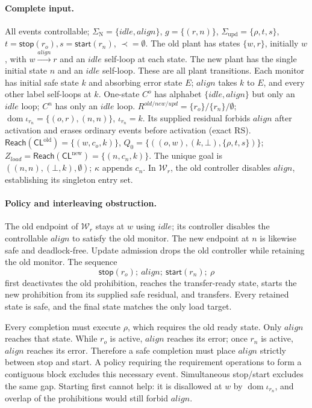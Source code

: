 \documentclass[11pt]{article}
\newcommand{\Reach}{\mathsf{Reach}}
\newcommand{\SigmaU}{\Sigma_{\mathrm{upd}}}
\newcommand{\ustart}[1]{\mathsf{start}(#1)}
\newcommand{\ustop}[1]{\mathsf{stop}(#1)}
\begin{document}
\paragraph{Complete input.}
All events controllable; $\Sigma_{\mathrm{N}}=\{idle,align\}$, $g=\{(r,n)\}$,
$\SigmaU=\{\rho,t,s\}$, $t=\ustop{r_o},s=\ustart{r_n}$, $\prec=\emptyset$.
The old plant has states $\{w,r\}$, initially $w$, with $w\xrightarrow{align}r$ and an $idle$ self-loop at each state. The new plant has the single initial state $n$ and an $idle$ self-loop. These are all plant transitions.
Each monitor has initial safe state $k$ and absorbing error state $E$; $align$ takes $k$ to $E$, and every other label self-loops at $k$.
One-state $C^o$ has alphabet $\{idle,align\}$ but only an $idle$ loop; $C^n$ has only an $idle$ loop.
$R^{old/new/upd}=\{r_o\}/\{r_n\}/\emptyset$;
$\operatorname{dom}\iota_{r_n}=\{(o,r),(n,n)\}$, $\iota_{r_n}=k$. Its supplied residual forbids $align$ after activation and erases ordinary events before activation (exact RS).
$\Reach(\mathsf{CL}^{\mathrm{old}})=\{(w,c_o,k)\}$,
$Q_0=\{((o,w),(k,\bot),\{\rho,t,s\})\}$;
$Z_{load}=\Reach(\mathsf{CL}^{\mathrm{new}})=\{(n,c_n,k)\}$. The unique goal is $((n,n),(\bot,k),\emptyset)$; $\kappa$ appends $c_n$.
In $\mathcal W_r$, the old controller disables $align$, establishing its singleton entry set.

\paragraph{Policy and interleaving obstruction.}
The old endpoint of $\mathcal W_r$ stays at $w$ using $idle$; its controller disables the controllable $align$ to satisfy the old monitor. The new endpoint at $n$ is likewise safe and deadlock-free. Update admission drops the old controller while retaining the old monitor. The sequence
\[
  \ustop{r_o};\ align;\ \ustart{r_n};\ \rho
\]
first deactivates the old prohibition, reaches the transfer-ready state, starts the new prohibition from its supplied safe residual, and transfers. Every retained state is safe, and the final state matches the only load target.

Every completion must execute $\rho$, which requires the old ready state. Only $align$ reaches that state. While $r_o$ is active, $align$ reaches its error; once $r_n$ is active, $align$ reaches its error. Therefore a safe completion must place $align$ strictly between stop and start. A policy requiring the requirement operations to form a contiguous block excludes this necessary event. Simultaneous stop/start excludes the same gap. Starting first cannot help: it is disallowed at $w$ by $\operatorname{dom}\iota_{r_n}$, and overlap of the prohibitions would still forbid $align$.
\end{document}
